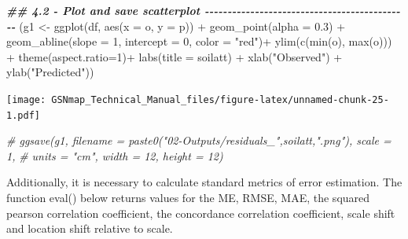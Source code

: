 \documentclass[
  10pt,
  b5paper,
  oneside]{book}
\newenvironment{Shaded}{\begin{snugshade}}{\end{snugshade}}
\newcommand{\AttributeTok}[1]{\textcolor[rgb]{0.77,0.63,0.00}{#1}}
\newcommand{\CommentTok}[1]{\textcolor[rgb]{0.56,0.35,0.01}{\textit{#1}}}
\newcommand{\DecValTok}[1]{\textcolor[rgb]{0.00,0.00,0.81}{#1}}
\newcommand{\DocumentationTok}[1]{\textcolor[rgb]{0.56,0.35,0.01}{\textbf{\textit{#1}}}}
\newcommand{\FloatTok}[1]{\textcolor[rgb]{0.00,0.00,0.81}{#1}}
\newcommand{\FunctionTok}[1]{\textcolor[rgb]{0.00,0.00,0.00}{#1}}
\newcommand{\NormalTok}[1]{#1}
\newcommand{\OtherTok}[1]{\textcolor[rgb]{0.56,0.35,0.01}{#1}}
\newcommand{\SpecialCharTok}[1]{\textcolor[rgb]{0.00,0.00,0.00}{#1}}
\newcommand{\StringTok}[1]{\textcolor[rgb]{0.31,0.60,0.02}{#1}}
\begin{document}
\begin{Shaded}
\begin{Highlighting}[]
  \DocumentationTok{\#\# 4.2 {-} Plot and save scatterplot {-}{-}{-}{-}{-}{-}{-}{-}{-}{-}{-}{-}{-}{-}{-}{-}{-}{-}{-}{-}{-}{-}{-}{-}{-}{-}{-}{-}{-}{-}{-}{-}{-}{-}{-}{-}{-}{-}{-}{-}{-}{-}{-}{-}{-} }
\NormalTok{  (g1 }\OtherTok{\textless{}{-}} \FunctionTok{ggplot}\NormalTok{(df, }\FunctionTok{aes}\NormalTok{(}\AttributeTok{x =}\NormalTok{ o, }\AttributeTok{y =}\NormalTok{ p)) }\SpecialCharTok{+} 
     \FunctionTok{geom\_point}\NormalTok{(}\AttributeTok{alpha =} \FloatTok{0.3}\NormalTok{) }\SpecialCharTok{+} 
     \FunctionTok{geom\_abline}\NormalTok{(}\AttributeTok{slope =} \DecValTok{1}\NormalTok{, }\AttributeTok{intercept =} \DecValTok{0}\NormalTok{, }\AttributeTok{color =} \StringTok{"red"}\NormalTok{)}\SpecialCharTok{+}
     \FunctionTok{ylim}\NormalTok{(}\FunctionTok{c}\NormalTok{(}\FunctionTok{min}\NormalTok{(o), }\FunctionTok{max}\NormalTok{(o))) }\SpecialCharTok{+} \FunctionTok{theme}\NormalTok{(}\AttributeTok{aspect.ratio=}\DecValTok{1}\NormalTok{)}\SpecialCharTok{+} 
     \FunctionTok{labs}\NormalTok{(}\AttributeTok{title =}\NormalTok{ soilatt) }\SpecialCharTok{+} 
     \FunctionTok{xlab}\NormalTok{(}\StringTok{"Observed"}\NormalTok{) }\SpecialCharTok{+} \FunctionTok{ylab}\NormalTok{(}\StringTok{"Predicted"}\NormalTok{))}
\end{Highlighting}
\end{Shaded}

\texttt{[image: GSNmap\_Technical\_Manual\_files/figure-latex/unnamed-chunk-25-1.pdf]}

\begin{Shaded}
\begin{Highlighting}[]
  \CommentTok{\# ggsave(g1, filename = paste0("02{-}Outputs/residuals\_",soilatt,".png"), scale = 1,}
  \CommentTok{\#        units = "cm", width = 12, height = 12)}
\end{Highlighting}
\end{Shaded}

Additionally, it is necessary to calculate standard metrics of error estimation. The function eval() below returns values for the ME, RMSE, MAE, the squared pearson correlation coefficient, the concordance correlation coefficient, scale shift and location shift relative to scale.

\begin{Shaded}
\end{Shaded}
\end{document}
